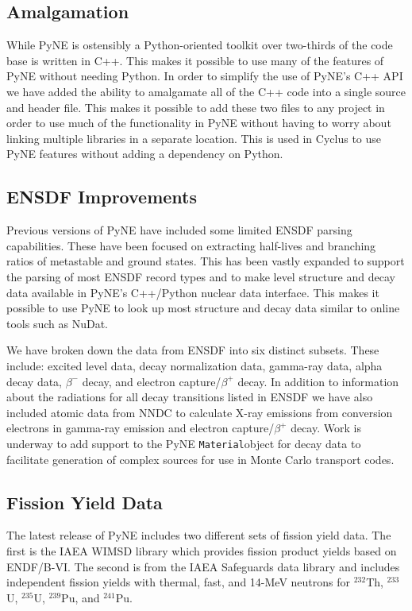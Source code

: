\documentclass{anstrans}
\newcommand{\Material}{\texttt{Material}}
\begin{document}
\subsection{Amalgamation}

While PyNE is ostensibly a Python-oriented toolkit over two-thirds 
of the code base is written in C++. This makes it possible to use many 
of the features of PyNE without needing Python. In order to simplify 
the use of PyNE's C++ API we have added the ability to amalgamate all 
of the C++ code into a single source and header file. This makes it 
possible to add these two files to any project in order to use much of the 
functionality in PyNE without having to worry about linking multiple 
libraries in a separate location. This is used in Cyclus 
\cite{carlsen_cyclus_2014} to use PyNE features without adding a dependency on 
Python.

\subsection{ENSDF Improvements}

Previous versions of PyNE have included some limited ENSDF parsing capabilities. 
These have been focused on extracting half-lives and branching ratios of 
metastable and ground states. This has been vastly expanded to support the 
parsing of most ENSDF record types and to make level structure and decay data 
available in PyNE's C++/Python nuclear data interface. This makes it possible 
to use PyNE to look up most structure and decay data similar to online tools
such as NuDat. 

We have broken down the data from ENSDF into six distinct subsets. These 
include: excited level data, decay normalization data, gamma-ray data, alpha 
decay data, $\beta^-$ decay, and electron capture/$\beta^+$ decay. In addition 
to information about the radiations for all decay transitions listed in ENSDF we 
have also included atomic data from NNDC to calculate X-ray emissions from 
conversion electrons in gamma-ray emission and electron capture/$\beta^+$ decay. %
Work is underway to add support to the PyNE \Material object for decay data to
facilitate generation of complex sources for use in Monte Carlo transport codes. 

\subsection{Fission Yield Data}

The latest release of PyNE includes two different sets of fission yield data. 
The first is the IAEA WIMSD library which provides fission product yields 
based on ENDF/B-VI. The second is from the IAEA Safeguards data library and includes 
independent fission yields with thermal, fast, and 14-MeV neutrons for $^{232}$Th, 
$^{233}$U, $^{235}$U, $^{239}$Pu, and $^{241}$Pu.
\end{document}
